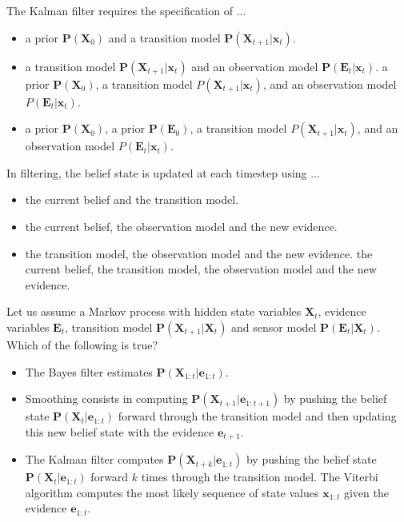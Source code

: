 \documentclass[11pt, a4paper]{article}
\begin{document}
The Kalman filter requires the specification of ...
\begin{itemize}
    \item a prior $\mathbf{P}(\mathbf{X}_0)$ and a transition model $\mathbf{P}(\mathbf{X}_{t+1}|\mathbf{x}_t)$.
    \item a transition model $\mathbf{P}(\mathbf{X}_{t+1}|\mathbf{x}_t)$ and an observation model $\mathbf{P}(\mathbf{E}_t | \mathbf{x}_t)$.
    \solitem a prior $\mathbf{P}(\mathbf{X}_0)$, a transition model $P(\mathbf{X}_{t+1}|\mathbf{x}_t)$, and an observation model $P(\mathbf{E}_t | \mathbf{x}_t)$. %
    \item a prior $\mathbf{P}(\mathbf{X}_0)$, a prior $\mathbf{P}(\mathbf{E}_0)$, a transition model $P(\mathbf{X}_{t+1}|\mathbf{x}_t)$, and an observation model $P(\mathbf{E}_t | \mathbf{x}_t)$.
\end{itemize}

In filtering, the belief state is updated at each timestep using ...
\begin{itemize}
    \item the current belief and the transition model.
    \item the current belief, the observation model and the new evidence.
    \item the transition model, the observation model and the new evidence.
    \solitem the current belief, the transition model, the observation model and the new evidence. %
\end{itemize}

Let us assume a Markov process with hidden state variables $\mathbf{X}_t$, evidence variables $\mathbf{E}_t$, transition model $\mathbf{P}(\mathbf{X}_{t+1}|\mathbf{X}_t)$ and  sensor model $\mathbf{P}(\mathbf{E}_{t}|\mathbf{X}_t)$. Which of the following is true?
\begin{itemize}
    \item The Bayes filter estimates $\mathbf{P}(\mathbf{X}_{1:t}|\mathbf{e}_{1:t})$.
    \item Smoothing consists in computing $\mathbf{P}(\mathbf{X}_{t+1}|\mathbf{e}_{1:t+1})$ by pushing the belief state $\mathbf{P}(\mathbf{X}_t|\mathbf{e}_{1:t})$ forward through the transition model  and then updating this new belief state with the evidence $\mathbf{e}_{t+1}$. 
    \item The Kalman filter computes $\mathbf{P}(\mathbf{X}_{t+k}|\mathbf{e}_{1:t})$ by pushing the belief state $\mathbf{P}(\mathbf{X}_t|\mathbf{e}_{1:t})$ forward $k$ times through the transition model.
    \solitem The Viterbi algorithm computes the most likely sequence of state values $\mathbf{x}_{1:t}$ given the evidence $\mathbf{e}_{1:t}$. %
\end{itemize}
\end{document}

